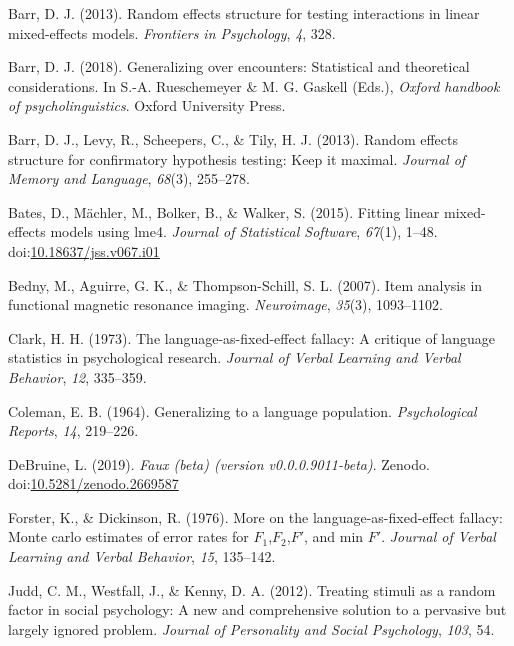 \documentclass[doc,floatsintext]{apa6}
\begin{document}
\leavevmode\hypertarget{ref-barr_2013}{}%
Barr, D. J. (2013). Random effects structure for testing interactions in linear mixed-effects models. \emph{Frontiers in Psychology}, \emph{4}, 328.

\leavevmode\hypertarget{ref-barr_2018}{}%
Barr, D. J. (2018). Generalizing over encounters: Statistical and theoretical considerations. In S.-A. Rueschemeyer \& M. G. Gaskell (Eds.), \emph{Oxford handbook of psycholinguistics}. Oxford University Press.

\leavevmode\hypertarget{ref-barr_et_al_2013}{}%
Barr, D. J., Levy, R., Scheepers, C., \& Tily, H. J. (2013). Random effects structure for confirmatory hypothesis testing: Keep it maximal. \emph{Journal of Memory and Language}, \emph{68}(3), 255--278.

\leavevmode\hypertarget{ref-R-lme4}{}%
Bates, D., Mächler, M., Bolker, B., \& Walker, S. (2015). Fitting linear mixed-effects models using lme4. \emph{Journal of Statistical Software}, \emph{67}(1), 1--48. doi:\href{https://doi.org/10.18637/jss.v067.i01}{10.18637/jss.v067.i01}

\leavevmode\hypertarget{ref-bedny_aguirre_thompson-schill_2007}{}%
Bedny, M., Aguirre, G. K., \& Thompson-Schill, S. L. (2007). Item analysis in functional magnetic resonance imaging. \emph{Neuroimage}, \emph{35}(3), 1093--1102.

\leavevmode\hypertarget{ref-clark_1973}{}%
Clark, H. H. (1973). The language-as-fixed-effect fallacy: A critique of language statistics in psychological research. \emph{Journal of Verbal Learning and Verbal Behavior}, \emph{12}, 335--359.

\leavevmode\hypertarget{ref-coleman_1964}{}%
Coleman, E. B. (1964). Generalizing to a language population. \emph{Psychological Reports}, \emph{14}, 219--226.

\leavevmode\hypertarget{ref-R-faux}{}%
DeBruine, L. (2019). \emph{Faux (beta) (version v0.0.0.9011-beta)}. Zenodo. doi:\href{https://doi.org/10.5281/zenodo.2669587}{10.5281/zenodo.2669587}

\leavevmode\hypertarget{ref-forster_dickinson_1976}{}%
Forster, K., \& Dickinson, R. (1976). More on the language-as-fixed-effect fallacy: Monte carlo estimates of error rates for \(F_1\),\(F_2\),\(F'\), and min \(F'\). \emph{Journal of Verbal Learning and Verbal Behavior}, \emph{15}, 135--142.

\leavevmode\hypertarget{ref-judd_westfall_kenny_2012}{}%
Judd, C. M., Westfall, J., \& Kenny, D. A. (2012). Treating stimuli as a random factor in social psychology: A new and comprehensive solution to a pervasive but largely ignored problem. \emph{Journal of Personality and Social Psychology}, \emph{103}, 54.
\end{document}
